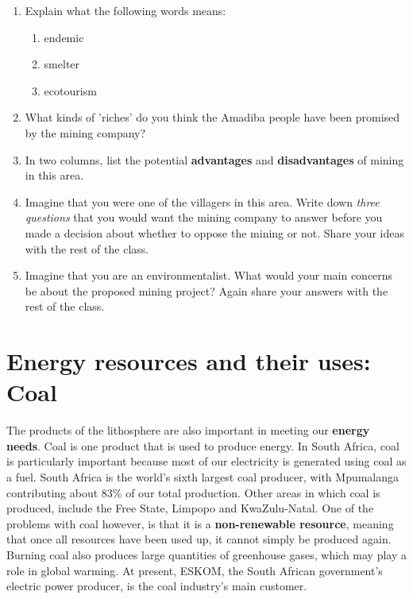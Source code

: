 {\begin{enumerate}
\item{Explain what the following words means:}
	\begin{enumerate}
	\item{endemic}
	\item{smelter}
	\item{ecotourism}
	\end{enumerate}
\item{What kinds of 'riches' do you think the Amadiba people have been promised by the mining company?}
\item{In two columns, list the potential \textbf{advantages} and \textbf{disadvantages} of mining in this area.}
\item{Imagine that you were one of the villagers in this area. Write down \textit{three questions} that you would want the mining company to answer before you made a decision about whether to oppose the mining or not. Share your ideas with the rest of the class.}
\item{Imagine that you are an environmentalist. What would your main concerns be about the proposed mining project? Again share your answers with the rest of the class.}
\end{enumerate}

}







\section{Energy resources and their uses: Coal}
\label{sec:mining:energy}

The products of the lithosphere are also important in meeting our \textbf{energy needs}. Coal is one product that is used to produce energy. In South Africa, coal is particularly important because most of our electricity is generated using coal as a fuel.  South Africa is the world's sixth largest coal producer, with Mpumalanga contributing about 83\% of our total production. Other areas in which coal is produced, include the Free State, Limpopo and KwaZulu-Natal. One of the problems with coal however, is that it is a \textbf{non-renewable resource}, meaning that once all resources have been used up, it cannot simply be produced again. Burning coal also produces large quantities of greenhouse gases, which may play a role in global warming. At present, ESKOM, the South African government's electric power producer, is the coal industry's main customer.\\


